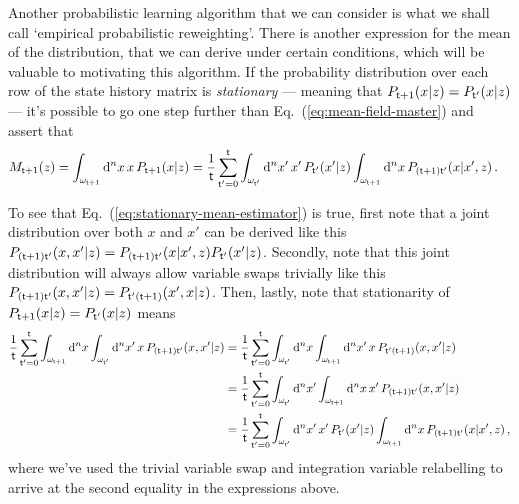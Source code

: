 Another probabilistic learning algorithm that we can consider is what we shall call `empirical probabilistic reweighting'. There is another expression for the mean of the distribution, that we can derive under certain conditions, which will be valuable to motivating this algorithm. If the probability distribution over each row of the state history matrix is \emph{stationary} --- meaning that $P_{{\sf t}+1}(x\vert z)=P_{{\sf t}'}(x\vert z)$ --- it's possible to go one step further than Eq.~(\ref{eq:mean-field-master}) and assert that
\begin{align}
M_{{\sf t}+1}(z) &= \int_{\omega_{{\sf t}+1}}{\rm d}^nx \,x\,P_{{\sf t}+1}(x\vert z) = \frac{1}{{\sf t}}\sum_{{\sf t}'=0}^{{\sf t}}\int_{\omega_{{\sf t}'}}{\rm d}^nx' \,x'\, P_{{\sf t}'}(x'\vert z) \int_{\omega_{{\sf t}+1}}{\rm d}^nx\, P_{({\sf t}+1){\sf t}'}(x\vert x',z) \label{eq:stationary-mean-estimator}\,.
\end{align}

To see that Eq.~(\ref{eq:stationary-mean-estimator}) is true, first note that a joint distribution over both $x$ and $x'$ can be derived like this $P_{({\sf t}+1){\sf t}'}(x,x'\vert z)=P_{({\sf t}+1){\sf t}'}(x\vert x',z)P_{{\sf t}'}(x'\vert z)$. Secondly, note that this joint distribution will always allow variable swaps trivially like this $P_{({\sf t}+1){\sf t}'}(x,x'\vert z)=P_{{\sf t}'({\sf t}+1)}(x',x\vert z)$. Then, lastly, note that stationarity of $P_{{\sf t}+1}(x\vert z)=P_{{\sf t}'}(x\vert z)$ means 
\begin{align}
\frac{1}{{\sf t}}\sum_{{\sf t}'=0}^{{\sf t}}\int_{\omega_{{\sf t}+1}} {\rm d}^nx\int_{\omega_{{\sf t}'}} {\rm d}^nx' \,x\, P_{({\sf t}+1){\sf t}'}(x,x'\vert z)&=\frac{1}{{\sf t}}\sum_{{\sf t}'=0}^{{\sf t}}\int_{\omega_{{\sf t}'}} {\rm d}^nx\int_{\omega_{{\sf t}+1}} {\rm d}^nx' \,x\, P_{{\sf t}'({\sf t}+1)}(x,x'\vert z)\nonumber \\
&=\frac{1}{{\sf t}}\sum_{{\sf t}'=0}^{{\sf t}}\int_{\omega_{{\sf t}'}} {\rm d}^nx'\int_{\omega_{{\sf t}+1}} {\rm d}^nx \,x'\, P_{({\sf t}+1){\sf t}'}(x,x'\vert z) \nonumber \\
&=\frac{1}{{\sf t}}\sum_{{\sf t}'=0}^{{\sf t}}\int_{\omega_{{\sf t}'}}{\rm d}^nx' \,x'\, P_{{\sf t}'}(x'\vert z) \int_{\omega_{{\sf t}+1}}{\rm d}^nx\, P_{({\sf t}+1){\sf t}'}(x\vert x',z)\nonumber \,,
\end{align}
where we've used the trivial variable swap and integration variable relabelling to arrive at the second equality in the expressions above. 

